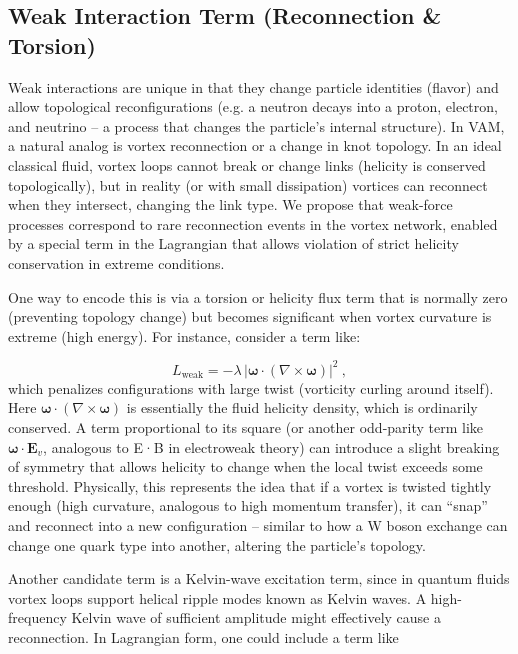 \documentclass[a4paper,12pt]{article}
\begin{document}
        
        \subsection{Weak Interaction Term (Reconnection \& Torsion)}
        
        Weak interactions are unique in that they change particle identities (flavor) and allow topological reconfigurations (e.g. a neutron decays into a proton, electron, and neutrino – a process that changes the particle’s internal structure). In VAM, a natural analog is vortex reconnection or a change in knot topology. In an ideal classical fluid, vortex loops cannot break or change links (helicity is conserved topologically), but in reality (or with small dissipation) vortices can reconnect when they intersect, changing the link type. We propose that weak-force processes correspond to rare reconnection events in the vortex network, enabled by a special term in the Lagrangian that allows violation of strict helicity conservation in extreme conditions.
        
        
        One way to encode this is via a torsion or helicity flux term that is normally zero (preventing topology change) but becomes significant when vortex curvature is extreme (high energy). For instance, consider a term like:
        
        \[
        L_{\text{weak}} = -\lambda \, |\mathbf{\omega} \cdot (\nabla \times \mathbf{\omega})|^2 ~,
        \]
        which penalizes configurations with large twist (vorticity curling around itself). Here $\mathbf{\omega} \cdot (\nabla \times \mathbf{\omega})$ is essentially the fluid helicity density, which is ordinarily conserved. A term proportional to its square (or another odd-parity term like $\mathbf{\omega}\cdot\mathbf{E}_v$, analogous to E·B in electroweak theory) can introduce a slight breaking of symmetry that allows helicity to change when the local twist exceeds some threshold. Physically, this represents the idea that if a vortex is twisted tightly enough (high curvature, analogous to high momentum transfer), it can “snap” and reconnect into a new configuration – similar to how a W boson exchange can change one quark type into another, altering the particle’s topology.
        
        
        Another candidate term is a Kelvin-wave excitation term, since in quantum fluids vortex loops support helical ripple modes known as Kelvin waves. A high-frequency Kelvin wave of sufficient amplitude might effectively cause a reconnection. In Lagrangian form, one could include a term like
        
\end{document}
